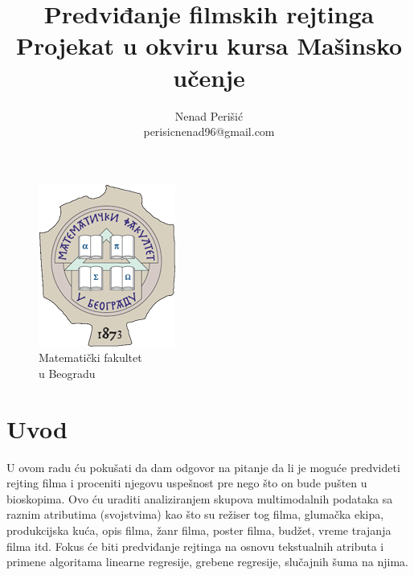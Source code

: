 \documentclass[a4paper]{article}
\begin{document}
\title{\textbf{Predviđanje filmskih rejtinga}\\
\small{Projekat u okviru kursa Mašinsko učenje}}

\author{Nenad Perišić\\perisicnenad96@gmail.com\\}

\medskip

\newpage

\maketitle


\vspace{2cm}
\begin{figure}[b!]
\begin{center}
\includegraphics[scale=0.67]{matf_logo.png} \\
\small{Matematički fakultet \\ u Beogradu}
\end{center}
\end{figure}


\pagebreak

\tableofcontents

\newpage

\section{Uvod}
\label{sec:uvod}
U ovom radu ću pokušati da dam odgovor na pitanje da li je moguće predvideti rejting filma i proceniti njegovu uspešnost pre nego što on bude pušten u bioskopima. Ovo ću uraditi analiziranjem skupova multimodalnih podataka sa raznim atributima (svojstvima) kao što su režiser tog filma, glumačka ekipa, produkcijska kuća, opis filma, žanr filma, poster filma, budžet, vreme trajanja filma itd. Fokus će biti predviđanje rejtinga na osnovu tekstualnih atributa i primene algoritama linearne regresije, grebene regresije, slučajnih šuma na njima.
\end{document}
